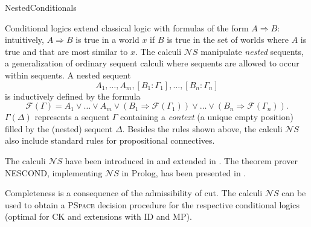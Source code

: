 \begin{entry}{NestedConditionals}
 \begin{clarifications}
Conditional logics extend classical logic with formulas of the form $A \Rightarrow B$: intuitively, $A \Rightarrow B$ is true in a world $x$ if $B$ is true in the set of worlds where $A$ is true and that are most similar to $x$. The calculi $\mathcal{N}S$ manipulate \emph{nested} sequents, a generalization of ordinary sequent calculi where sequents are allowed to occur within sequents. A nested sequent $$A_1, \dots, A_m, [B_1: \Gamma_1], \dots, [B_n: \Gamma_n]$$ is inductively defined by the formula $$\mathcal{F}(\Gamma)=A_1 \vee \dots \vee A_m \vee (B_1 \Rightarrow \mathcal{F}(\Gamma_1)) \vee \dots \vee (B_n \Rightarrow \mathcal{F}(\Gamma_n)).$$ $\Gamma(\Delta)$ represents a sequent $\Gamma$ containing a \emph{context} (a unique empty position) filled by the (nested) sequent $\Delta$.
  Besides the rules shown above, the calculi $\mathcal{N}S$ also include standard 
   rules for propositional connectives.
 \end{clarifications}

 \begin{history}
  The calculi $\mathcal{N}S$ have been introduced in 
  \cite{jelia2012pozz} and extended  in \cite{jlcpozz}. The theorem prover NESCOND, implementing $\mathcal{N}S$ in Prolog, has been presented in \cite{ijcarpozz}.
 \end{history}

 \begin{technicalities}
Completeness is a consequence of the admissibility of cut. The calculi $\mathcal{N}S$ can be used to obtain a \textsc{PSpace} decision procedure for the respective conditional logics (optimal for CK and extensions with ID and MP).
 \end{technicalities}













\end{entry}
